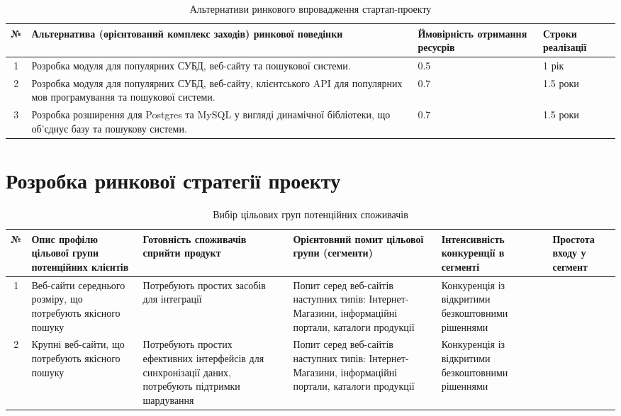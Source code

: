 \begin{table}
	\begin{tabular}{|c|p{4cm}|p{4cm}|p{4cm}|} \hline
		№ & Альтернатива (орієнтований комплекс заходів) ринкової поведінки & Ймовірність отримання ресусрів & Строки реалізації \\ \hline
		1 & Розробка модуля для популярних СУБД, веб-сайту та пошукової системи. & 0.5 & 1 рік \\ \hline
		2 & Розробка модуля для популярних СУБД, веб-сайту, клієнтського API для популярних мов програмування та пошукової системи. & 0.7 & 1.5 роки \\ \hline
		3 & Розробка розширення для Postgres та MySQL у вигляді динамічної бібліотеки, що об'єднує базу та пошукову системи. & 0.7 & 1.5 роки \\ \hline
	\end{tabular}
	\caption{Альтернативи ринкового впровадження стартап-проекту}
\end{table}
\section{Розробка ринкової стратегії проекту}
\begin{table}
	\begin{tabular}
		{|c|p{3cm}|p{3cm}|p{3cm}|p{3cm}|p{3cm}|}
		№ & Опис профілю цільової групи потенційних клієнтів & Готовність споживачів сприйти продукт & Орієнтовний помит цільової групи (сегменти)  & Інтенсивність конкуренції в сегменті & Простота входу у сегмент \\ \hline
		1 & Веб-сайти середнього розміру, що потребують якісного пошуку & Потребують простих засобів для інтеграції & Попит серед веб-сайтів наступних типів: Інтернет-Магазини, інформаційні портали, каталоги продукції & Конкуренція із відкритими безкоштовними рішеннями \\
		2 & Крупні веб-сайти, що потребують якісного пошуку & Потребують простих ефективних інтерфейсів для синхронізації даних, потребують підтримки шардування & Попит серед веб-сайтів наступних типів: Інтернет-Магазини, інформаційні портали, каталоги продукції & Конкуренція із відкритими безкоштовними рішеннями \\
	\end{tabular}
	\caption{Вибір цільових груп потенційних споживачів}
\end{table}

